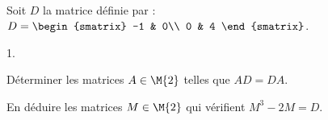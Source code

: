 \documentclass[11pt]{article}%
\begin{document}
\begin{exerciceSP}~\\
  Soit $D$ la matrice définie par : $D = 
  \begin{smatrix} 
    -1 & 0\\ 
    0 & 4
  \end{smatrix}$.
  \begin{noliste}{1.}
    \setlength{\itemsep}{2mm}
  \item Déterminer les matrices $A\in\M{2}$ telles que $AD=DA$.
  \item En déduire les matrices $M\in\M{2}$ qui vérifient $M^3-2M=D$.
  \end{noliste}
\end{exerciceSP}


\newpage


\end{document}
